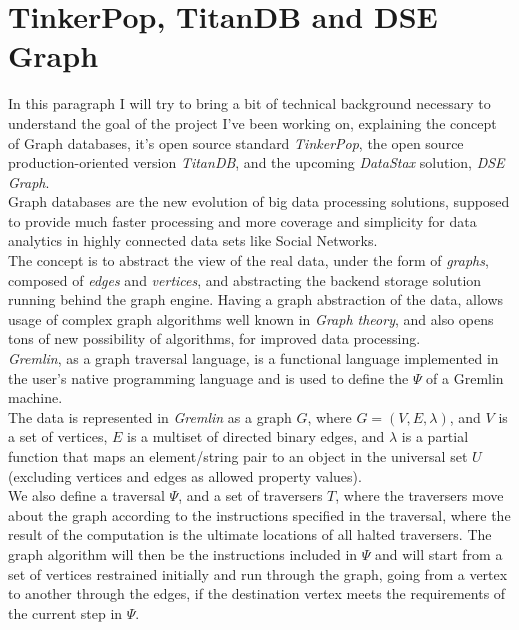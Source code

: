 \documentclass[a4paper]{report}
\newcommand{\ds}{\emph{DataStax\xspace}}
\newcommand{\dseg}{\emph{DSE Graph\xspace}}
\newcommand{\tdb}{\emph{TitanDB\xspace}}
\begin{document}
\section{TinkerPop, TitanDB and DSE Graph}
In this paragraph I will try to bring a bit of technical background necessary to understand the goal of the project I've been working on, explaining the concept of Graph databases, it's open source standard \emph{TinkerPop}, the open source production-oriented version \tdb{}, and the upcoming \ds{} solution, \dseg{}.\\
Graph databases are the new evolution of big data processing solutions, supposed to provide much faster processing and more coverage and simplicity for data analytics in highly connected data sets like Social Networks.\\
The concept is to abstract the view of the real data, under the form of \emph{graphs}, composed of \emph{edges} and \emph{vertices}, and abstracting the backend storage solution running behind the graph engine. Having a graph abstraction of the data, allows usage of complex graph algorithms well known in \emph{Graph theory}, and also opens tons of new possibility of algorithms, for improved data processing.\\
\emph{Gremlin}, as a graph traversal language, is a functional language implemented in the user's native programming language and is used to define the $\Psi$ of a Gremlin machine.\\
The data is represented in \emph{Gremlin} as a graph $G$, where $G = (V, E, \lambda)$, and $V$ is a set of vertices, $E$ is a multiset of directed binary edges, and $\lambda$ is a partial function that maps an element/string pair to an object in the universal set $U$ (excluding vertices and edges as allowed property values).\\
We also define a traversal $\Psi$, and a set of traversers $T$, where the traversers move about the graph according to the instructions specified in the traversal, where the result of the computation is the ultimate locations of all halted traversers. The graph algorithm will then be the instructions included in $\Psi$ and will start from a set of vertices restrained initially and run through the graph, going from a vertex to another through the edges, if the destination vertex meets the requirements of the current step in $\Psi$.\\
\end{document}
